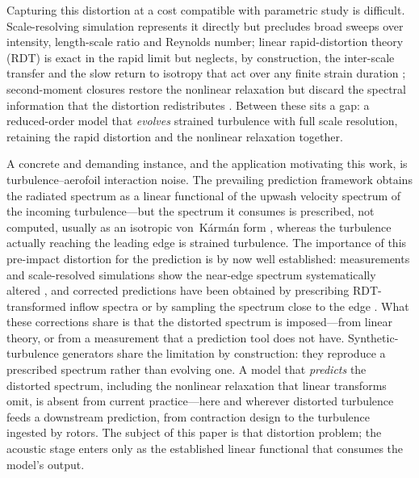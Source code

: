\documentclass[lineno]{JFM-FLM_Au}
\begin{document}
Capturing this distortion at a cost compatible with parametric study is
difficult. Scale-resolving simulation represents it directly but
precludes broad sweeps over intensity, length-scale ratio and Reynolds
number; linear rapid-distortion theory (RDT) is exact in the rapid limit
but neglects, by construction, the inter-scale transfer and the slow
return to isotropy that act over any finite strain duration
\citep{SagautCambon2018}; second-moment closures restore the nonlinear
relaxation but discard the spectral information that the distortion
redistributes \citep{LaunderReeceRodi1975,Pope2000}. Between these sits
a gap: a reduced-order model that \emph{evolves} strained turbulence
with full scale resolution, retaining the rapid distortion and the
nonlinear relaxation together.

A concrete and demanding instance, and the application motivating this
work, is turbulence--aerofoil interaction noise. The prevailing
prediction framework \citep{Amiet1975,PatersonAmiet1977,RogerMoreau2010}
obtains the radiated spectrum as a linear functional of the upwash
velocity spectrum of the incoming turbulence---but the spectrum it
consumes is prescribed, not computed, usually as an isotropic
von~K\'arm\'an form \citep{vonKarman1948}, whereas the turbulence
actually reaching the leading edge is strained turbulence. The
importance of this pre-impact distortion for the prediction is by now
well established: measurements and scale-resolved simulations show the
near-edge spectrum systematically altered
\citep{dosSantos2023,Ribeiro2023,Piccolo2024}, and corrected predictions
have been obtained by prescribing RDT-transformed inflow spectra
\citep{deSantana2016,dosSantos2023} or by sampling the spectrum close to
the edge \citep{Piccolo2024}. What these corrections share is that the
distorted spectrum is imposed---from linear theory, or from a
measurement that a prediction tool does not have. Synthetic-turbulence
generators \citep{KimHaeri2015} share the limitation by construction:
they reproduce a prescribed spectrum rather than evolving one. A model
that \emph{predicts} the distorted spectrum, including the nonlinear
relaxation that linear transforms omit, is absent from current practice---here and wherever distorted turbulence feeds a downstream prediction, from
contraction design to the turbulence ingested by rotors. The subject
of this paper is that distortion problem; the acoustic stage enters
only as the established linear functional that consumes the model's
output.
\end{document}
